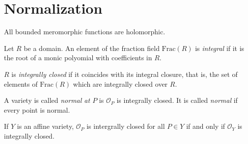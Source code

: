 \documentclass{book}
\begin{document}
\section{Normalization}
\label{section-normalization}

\noindent
All bounded meromorphic functions are
holomorphic.

\begin{definition}
\label{definition-integral-closure}
Let $R$ be a domain.
An element of the fraction field
$\text{Frac}(R)$
is {\it integral} if it is the root of a
monic polyomial
with coefficients in $R$.

$R$ is {\it integrally closed} if it
coincides with its integral closure,
that is, the set of
elements of $\text{Frac}(R)$
which are integrally closed over $R$.
\end{definition}

\begin{definition}
\label{definition-normal-variety}
A variety is called {\it normal at $P$}
is $\mathcal{O}_P$ is integrally closed.
It is called {\it normal} if every point
is normal.
\end{definition}

\begin{exercise}
\label{exercise-normal-varieties}
If $Y$ is an affine variety,
$\mathcal{O}_P$ is intergrally closed
for all $P \in Y$ if and only if
$\mathcal{O}_Y$ is integrally closed.
\end{exercise}
\end{document}
